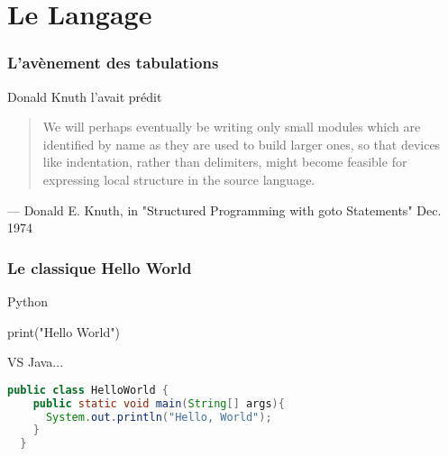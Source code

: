 \documentclass{beamer}
\begin{document}
\section{Le Langage}
\label{sec:language}

\begin{frame}[fragile]
  \frametitle{L'avènement des tabulations}

  \begin{block}{Donald Knuth l'avait prédit}
    \begin{quote}
      We will perhaps eventually be writing only small modules which are
      identified by name as they are used to build larger ones, so that
      devices like indentation, rather than delimiters, might become
      feasible for expressing local structure in the source language.   
    \end{quote}
    \centering
    \tiny
    — Donald E. Knuth, in "Structured Programming with goto
    Statements" Dec. 1974
  \end{block}


\end{frame}



\begin{frame}[fragile]
  \frametitle{Le classique Hello World}

    \begin{block}{Python}
    \begin{python}
  print("Hello World")
    \end{python}

    \end{block}

    \pause

    \begin{block}{VS Java...}
    \begin{lstlisting}[language=Java]
  public class HelloWorld {
    public static void main(String[] args){
      System.out.println("Hello, World");
    }
  }
    \end{lstlisting}
  \end{block}
\end{frame}
\end{document}
